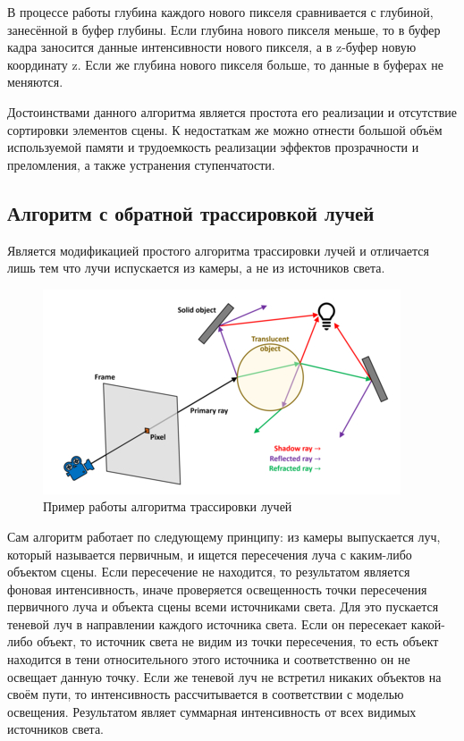 \documentclass[12pt,a4paper,oneside]{report}
\begin{document}
				В процессе работы глубина каждого нового пикселя сравнивается с глубиной, занесённой в буфер глубины. Если глубина нового пикселя меньше, то в буфер кадра заносится данные интенсивности нового пикселя, а в z-буфер новую координату z. Если же глубина нового пикселя больше, то данные в буферах не меняются.
				
				Достоинствами данного алгоритма является простота его реализации и отсутствие сортировки элементов сцены. К недостаткам же можно отнести большой объём используемой памяти и трудоемкость реализации эффектов прозрачности и преломления, а также устранения ступенчатости.
			\subsection{Алгоритм с обратной трассировкой лучей}
				\quad Является модификацией простого алгоритма трассировки лучей и отличается лишь тем что лучи испускается из камеры, а не из источников света.
				
				\begin{figure}[h]
					\centering
					\includegraphics[scale=0.6]{trace}
					\caption{Пример работы алгоритма трассировки лучей}
				\end{figure}
				
				Сам алгоритм работает по следующему принципу: из камеры выпускается луч, который называется первичным, и ищется пересечения луча с каким-либо объектом сцены. Если пересечение не находится, то результатом является фоновая интенсивность, иначе проверяется освещенность точки пересечения первичного луча и объекта сцены всеми источниками света. Для это пускается теневой луч в направлении каждого источника света. Если он пересекает какой-либо объект, то источник света не видим из точки пересечения, то есть объект находится в тени относительного этого источника и соответственно он не освещает данную точку. Если же теневой луч не встретил никаких объектов на своём пути, то интенсивность рассчитывается в соответствии с моделью освещения. Результатом являет суммарная интенсивность от всех видимых источников света.
				
\end{document}
